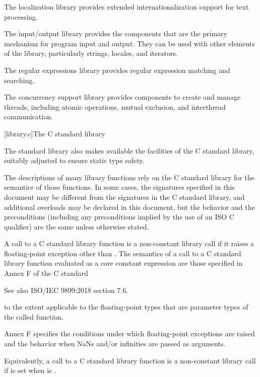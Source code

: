 \pnum
The localization library provides extended internationalization
support for text processing.

\pnum
The input/output library provides the
components that are the primary mechanism for \Cpp{} program input and output.
They can be used with other elements of the library, particularly
strings, locales, and iterators.

\pnum
The regular expressions library provides regular expression matching and searching.

\pnum
The concurrency support library provides components to create
and manage threads,
including atomic operations, mutual exclusion, and interthread communication.

[library.c]{The C standard library}

\pnum
The \Cpp{} standard library also makes available the facilities of the C standard library,
%
suitably adjusted to ensure static type safety.

\pnum
The descriptions of many library functions rely on the C standard library for
the semantics of those functions.
In some cases,
the signatures specified in this document
may be different from the signatures in the C standard library,
and additional overloads may be declared in this document,
but the behavior and the preconditions
(including any preconditions implied by the use of an
ISO C  qualifier)
are the same unless otherwise stated.

\pnum
A call to a C standard library function is
a non-constant library call
if it raises a floating-point exception other than .
The semantics of a call to a C standard library function
evaluated as a core constant expression
are those specified in Annex F of the C standard
\begin{footnote}
See also ISO/IEC 9899:2018 section 7.6.
\end{footnote}
to the extent applicable to the floating-point types
that are parameter types of the called function.
\begin{note}
Annex F specifies
the conditions under which floating-point exceptions are raised and
the behavior when NaNs and/or infinities are passed as arguments.
\end{note}
\begin{note}
Equivalently, a call to a C standard library function is
a non-constant library call
if  is set
when  is .
\end{note}

